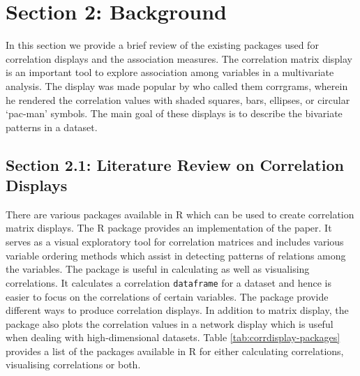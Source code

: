 \hypertarget{section-2-background}{%
\section{Section 2: Background}\label{section-2-background}}

In this section we provide a brief review of the existing packages used
for correlation displays and the association measures. The correlation
matrix display is an important tool to explore association among
variables in a multivariate analysis. The display was made popular by
\citet{friendly2002corrgrams} who called them corrgrams, wherein he
rendered the correlation values with shaded squares, bars, ellipses, or
circular `pac-man' symbols. The main goal of these displays is to
describe the bivariate patterns in a dataset.

\hypertarget{section-2.1-literature-review-on-correlation-displays}{%
\subsection{Section 2.1: Literature Review on Correlation
Displays}\label{section-2.1-literature-review-on-correlation-displays}}

There are various packages available in R which can be used to create
correlation matrix displays. The R package 
\citep{corrplot2021} provides an implementation of the
\citet{friendly2002corrgrams} paper. It serves as a visual exploratory
tool for correlation matrices and includes various variable ordering
methods which assist in detecting patterns of relations among the
variables. The package  \citep{corrr2020} is useful in
calculating as well as visualising correlations. It calculates a
correlation \texttt{dataframe} for a dataset and hence is easier to
focus on the correlations of certain variables. The package provide
different ways to produce correlation displays. In addition to matrix
display, the package also plots the correlation values in a network
display which is useful when dealing with high-dimensional datasets.
Table \ref{tab:corrdisplay-packages} provides a list of the packages
available in R for either calculating correlations, visualising
correlations or both.

